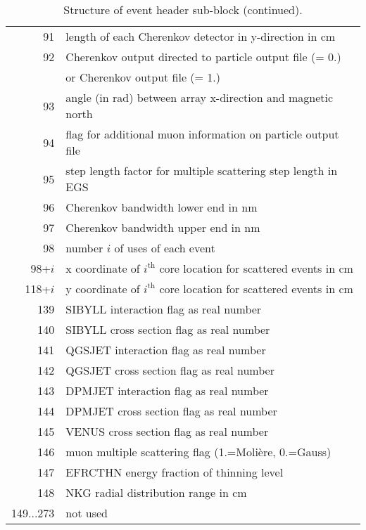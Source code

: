 {\begin{table}[p]
\begin{center}
\begin{tabular}{|r|l|}
91 &length of each Cherenkov detector in y-direction in cm                               \\
92 &Cherenkov output directed to particle output file (= 0.)                              \\
&or Cherenkov output file (= 1.)                                     \\
93 &angle (in rad) between array x-direction and magnetic north                               \\
94 &flag for additional muon information on particle output file                               \\
95 &step length factor for multiple scattering step length in EGS                               \\
96 &Cherenkov bandwidth lower end in nm \\
97 &Cherenkov bandwidth upper end in nm \\
98 &number $i$ of uses of each event \\
98+$i$& x coordinate of $i^{\mathrm{th}}$ core location for scattered events in cm \\
118+$i$& y coordinate of $i^{\mathrm{th}}$ core location for scattered events in cm\\
139 &SIBYLL interaction flag as real number \\
140 &SIBYLL cross section flag as real number \\
141 &QGSJET interaction flag as real number \\
142 &QGSJET cross section flag as real number \\
143 &DPMJET interaction flag as real number \\
144 &DPMJET cross section flag as real number \\
145 &VENUS cross section flag as real number \\
146 &muon multiple scattering flag (1.=Moli\`ere, 0.=Gauss) \\
147 &EFRCTHN energy fraction of thinning level \\
148 &NKG radial distribution range in cm \\
149...273 &not used\\
\hline
    \end{tabular}
  \end{center}
  \caption{Structure of event header sub-block (continued).}
  \label{tab:eh2}
\end{table}
}

